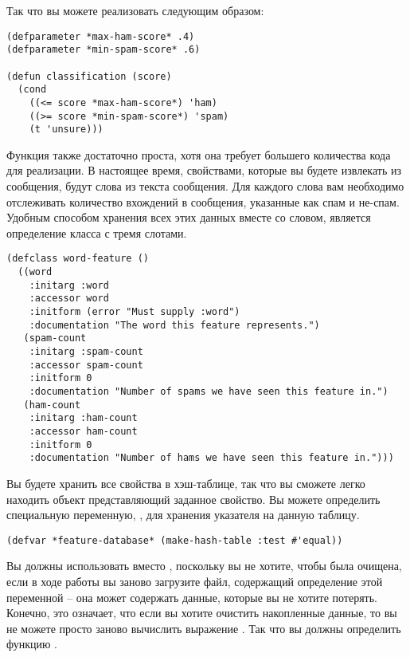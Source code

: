 Так что вы можете реализовать  следующим образом:

\begin{lstlisting}
(defparameter *max-ham-score* .4)
(defparameter *min-spam-score* .6)

(defun classification (score)
  (cond
    ((<= score *max-ham-score*) 'ham)
    ((>= score *min-spam-score*) 'spam)
    (t 'unsure)))
\end{lstlisting}

Функция  также достаточно проста, хотя она требует большего
количества кода для реализации.  В настоящее время, свойствами, которые вы будете
извлекать из сообщения, будут слова из текста сообщения.  Для каждого слова вам необходимо
отслеживать количество вхождений в сообщения, указанные как спам и не-спам.  Удобным
способом хранения всех этих данных вместе со словом, является определение класса
 с тремя слотами.

\begin{lstlisting}
(defclass word-feature ()
  ((word       
    :initarg :word
    :accessor word
    :initform (error "Must supply :word")
    :documentation "The word this feature represents.")
   (spam-count
    :initarg :spam-count
    :accessor spam-count
    :initform 0
    :documentation "Number of spams we have seen this feature in.")
   (ham-count
    :initarg :ham-count
    :accessor ham-count
    :initform 0
    :documentation "Number of hams we have seen this feature in.")))
\end{lstlisting}

Вы будете хранить все свойства в хэш-таблице, так что вы сможете легко находить объект
представляющий заданное свойство.  Вы можете определить специальную переменную,
, для хранения указателя на данную таблицу.

\begin{lstlisting}
(defvar *feature-database* (make-hash-table :test #'equal))
\end{lstlisting}

Вы должны использовать  вместо , поскольку вы не хотите,
чтобы  была очищена, если в ходе работы вы заново загрузите файл,
содержащий определение этой переменной -- она может содержать данные, которые вы не хотите
потерять.  Конечно, это означает, что если вы хотите очистить накопленные данные, то вы не
можете просто заново вычислить выражение .  Так что вы должны определить
функцию .

